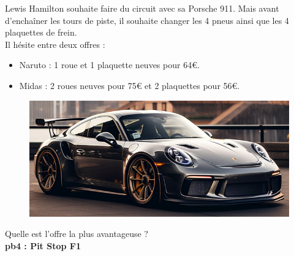 \begin{multicols}{2} 
  Lewis Hamilton souhaite faire du circuit avec sa Porsche 911. Mais avant d'enchaîner les tours de piste, il souhaite changer les 4 pneus ainsi que les 4 plaquettes de frein. \\

  Il hésite entre deux offres : 

  \begin{itemize}[label={$\bullet$}]
    \item Naruto : 1 roue et 1 plaquette neuves pour 64€.
    \item Midas : 2 roues neuves pour 75€ et 2 plaquettes pour 56€. 
  \end{itemize} \columnbreak

  \begin{figure}[H]
    \centering
    \includegraphics[width=0.9\linewidth]{5x2-inegalite-triangulaire/porsche.png}
  \end{figure} 
\end{multicols}

Quelle est l'offre la plus avantageuse ?\\

\textbf{pb4 : Pit Stop F1} \\

